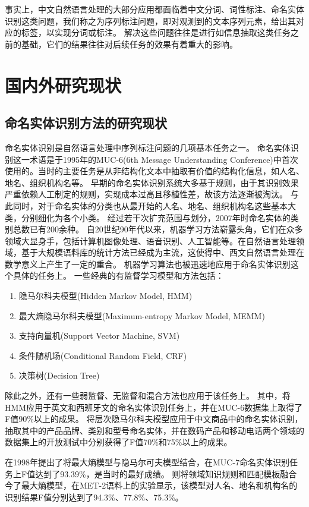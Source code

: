 事实上，中文自然语言处理的大部分应用都面临着中文分词、词性标注、命名实体识别这类问题，我们称之为序列标注问题，即对观测到的文本序列元素，给出其对应的标签，以实现分词或标注。
解决这些问题往往是进行如信息抽取这类任务之前的基础，它们的结果往往对后续任务的效果有着重大的影响。

\section{国内外研究现状}
\label{sec:current}
\subsection{命名实体识别方法的研究现状}
命名实体识别是自然语言处理中序列标注问题的几项基本任务之一。
命名实体识别这一术语是于1995年的MUC-6(6th Message Understanding Conference)中首次使用的。当时的主要任务是从非结构化文本中抽取有价值的结构化信息，如人名、地名、组织机构名等。
早期的命名实体识别系统大多基于规则，由于其识别效果严重依赖人工制定的规则，实现成本过高且移植性差，故该方法逐渐被淘汰。
与此同时，对于命名实体的分类也从最开始的人名、地名、组织机构名这些基本大类，分别细化为各个小类。
经过若干次扩充范围与划分，2007年时命名实体的类别总数已有200余种。
自20世纪90年代以来，机器学习方法崭露头角，它们在众多领域大显身手，包括计算机图像处理、语音识别、人工智能等。在自然语言处理领域，基于大规模语料库的统计方法已经成为主流，这使得中、西文自然语言处理在数学意义上产生了一定的重合。
机器学习算法也被迅速地应用于命名实体识别这个具体的任务上。
一些经典的有监督学习模型和方法包括：
\begin{enumerate}[\indent(1)]
    \item 隐马尔科夫模型(Hidden Markov Model, HMM)
    \item 最大熵隐马尔科夫模型(Maximum-entropy Markov Model, MEMM)
    \item 支持向量机(Support Vector Machine, SVM)
    \item 条件随机场(Conditional Random Field, CRF)
    \item 决策树(Decision Tree)
\end{enumerate}
除此之外，还有一些弱监督、无监督和混合方法也应用于该任务上。
其中，\citet{bikel1997nymble}将HMM应用于英文和西班牙文的命名实体识别任务上，并在MUC-6数据集上取得了F值90\%以上的成果。
\citet{liu2005product}将层次隐马尔科夫模型应用于中文商品中的命名实体识别，抽取其中的产品品牌、类别和型号命名实体，并在数码产品和移动电话两个领域的数据集上的开放测试中分别获得了F值70\%和75\%以上的成果。

\citet{mikheev1998description}在1998年提出了将最大熵模型与隐马尔可夫模型结合，在MUC-7命名实体识别任务上F值达到了93.39\%，是当时的最好成绩。
\citet{tsai2004mencius}则将领域知识规则和匹配模板融合今了最大熵模型，在MET-2语料上的实验显示，该模型对人名、地名和机构名的识别结果F值分别达到了94.3\%、77.8\%、75.3\%。

